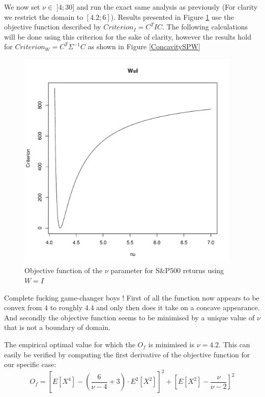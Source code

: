 We now set $\nu \in \; ]4;30]$ and run the exact same analysis as previously (For clarity we restrict the domain to $[4.2;6]$). Results presented in Figure \ref{ConcavitySPI} use the objective function described by $Criterion_I = C^T I C$. The following calculations will be done using this criterion for the sake of clarity, however the results hold for $Criterion_W = C^T \Sigma^{-1} C$ as shown in Figure \ref{ConcavitySPW} \bigskip
\begin{figure}
    \centering
    \includegraphics[width=0.95\textwidth]{ConcavityS&PI.pdf}
    \caption{Objective function of the $\nu$ parameter for S\&P500 returns using $W=I$}
    \label{ConcavitySPI}
\end{figure}
\par
Complete fucking game-changer boys ! First of all the function now appears to be convex from $4$ to roughly $4.4$ and only then does it take on a concave appearance. And secondly the objective function seems to be minimised by a unique value of $\nu$ that is not a boundary of domain.
\par
The empirical optimal value for which the $O_f$ is minimised is $\nu=4.2$. 
This can easily be verified by computing the first derivative of the objective function for our specific case:
\begin{equation}\label{ObjectiveFunction_I}
    O_f = \left[E\left[X^4\right] - \left(\frac{6}{\nu-4}+3\right)\cdot         
                E^2\left[X^2\right]\right]^2 +
            \left[E\left[X^2\right] - \frac{\nu}{\nu - 2}\right]^2
\end{equation}

